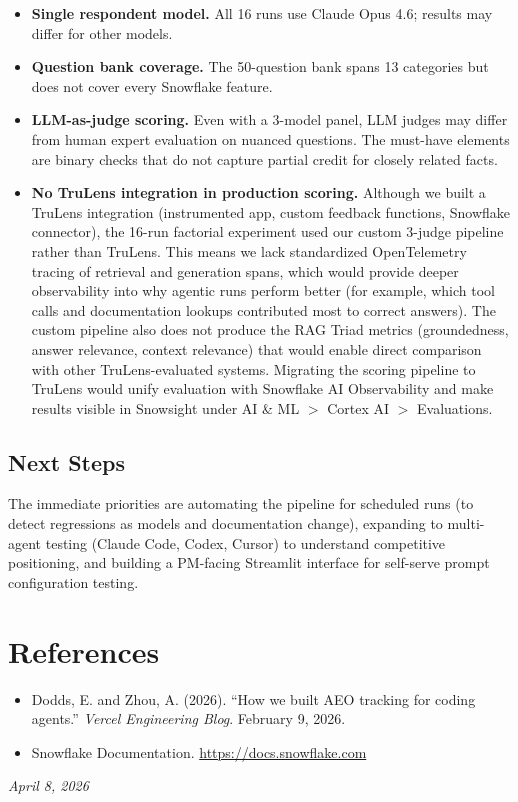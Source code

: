 \documentclass[11pt,letterpaper]{article}
\begin{document}
\begin{itemize}[nosep]
  \item \textbf{Single respondent model.} All 16 runs use Claude Opus 4.6; results may differ for other models.
  \item \textbf{Question bank coverage.} The 50-question bank spans 13 categories but does not cover every Snowflake feature.
  \item \textbf{LLM-as-judge scoring.} Even with a 3-model panel, LLM judges may differ from human expert evaluation on nuanced questions. The must-have elements are binary checks that do not capture partial credit for closely related facts.
  \item \textbf{No TruLens integration in production scoring.} Although we built a TruLens integration (instrumented app, custom feedback functions, Snowflake connector), the 16-run factorial experiment used our custom 3-judge pipeline rather than TruLens. This means we lack standardized OpenTelemetry tracing of retrieval and generation spans, which would provide deeper observability into why agentic runs perform better (for example, which tool calls and documentation lookups contributed most to correct answers). The custom pipeline also does not produce the RAG Triad metrics (groundedness, answer relevance, context relevance) that would enable direct comparison with other TruLens-evaluated systems. Migrating the scoring pipeline to TruLens would unify evaluation with Snowflake AI Observability and make results visible in Snowsight under AI \& ML $>$ Cortex AI $>$ Evaluations.
\end{itemize}

\subsection*{Next Steps}

The immediate priorities are automating the pipeline for scheduled runs (to detect regressions as models and documentation change), expanding to multi-agent testing (Claude Code, Codex, Cursor) to understand competitive positioning, and building a PM-facing Streamlit interface for self-serve prompt configuration testing.

\section*{References}

\begin{itemize}[nosep,leftmargin=*]
  \item Dodds, E. and Zhou, A. (2026). ``How we built AEO tracking for coding agents.'' \emph{Vercel Engineering Blog}. February 9, 2026.
  \item Snowflake Documentation. \url{https://docs.snowflake.com}
\end{itemize}

\vfill
\begin{center}
\textit{April 8, 2026}
\end{center}
\end{document}
